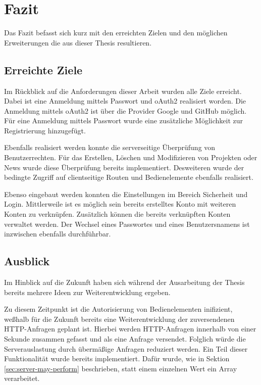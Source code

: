 \section{Fazit}
\label{sec:conclusion}
Das Fazit befasst sich kurz mit den erreichten Zielen und den möglichen Erweiterungen die aus dieser Thesis resultieren. 

\subsection{Erreichte Ziele}
Im Rückblick auf die Anforderungen dieser Arbeit wurden alle Ziele erreicht. Dabei ist eine Anmeldung mittels Passwort und \gls{oAuth2} realisiert worden. Die Anmeldung mittels \gls{oAuth2} ist über die Provider Google und GitHub möglich. Für eine Anmeldung mittels Passwort wurde eine zusätzliche Möglichkeit zur Registrierung hinzugefügt.

Ebenfalls realisiert werden konnte die serverseitige Überprüfung von Benutzerrechten. Für das Erstellen, Löschen und Modifizieren von Projekten oder News wurde diese Überprüfung bereits implementiert. Desweiteren wurde der bedingte Zugriff auf clientseitige Routen und Bedienelemente ebenfalls realisiert.

Ebenso eingebaut werden konnten die Einstellungen im Bereich Sicherheit und Login. Mittlerweile ist es möglich sein bereits erstelltes Konto mit weiteren Konten zu verknüpfen. Zusätzlich können die bereits verknüpften Konten verwaltet werden. Der Wechsel eines Passwortes und eines Benutzersnamens ist inzwischen ebenfalls durchführbar.

\subsection{Ausblick}
Im Hinblick auf die Zukunft haben sich während der Ausarbeitung der Thesis bereits mehrere Ideen zur Weiterentwicklung ergeben. 

Zu diesem Zeitpunkt ist die Autorisierung von Bedienelementen inifizient, we{\ss}halb für die Zukunft bereits eine Weiterentwicklung der zuversendenen \gls{HTTP}-Anfragen geplant ist. Hierbei werden \gls{HTTP}-Anfragen innerhalb von einer Sekunde zusammen gefasst und als eine Anfrage versendet. Folglich würde die Serverauslastung durch übermä{\ss}ige Anfragen reduziert werden. Ein Teil dieser Funktionalität wurde bereits implementiert. Dafür wurde, wie in Sektion \ref{sec:server-may-perform} beschrieben, statt einem einzelnen Wert ein Array verarbeitet.

